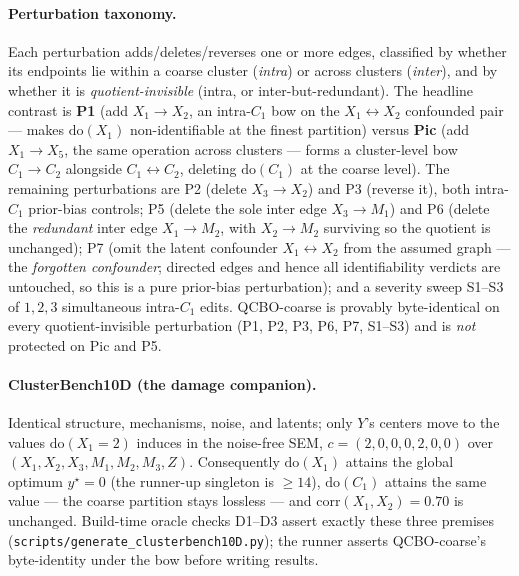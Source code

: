\documentclass[twoside]{article}
\newcommand{\doo}{\mathrm{do}}
\newcommand{\QCBO}{\textsc{QCBO}}
\newcommand{\CBO}{\textsc{CBO}}
\begin{document}
\paragraph{Perturbation taxonomy.}
Each perturbation adds/deletes/reverses one or more edges, classified by whether its
endpoints lie within a coarse cluster (\emph{intra}) or across clusters (\emph{inter}),
and by whether it is \emph{quotient-invisible} (intra, or inter-but-redundant). The
headline contrast is \textbf{P1} (add $X_1\!\to\!X_2$, an intra-$C_1$ bow on the
$X_1\!\leftrightarrow\!X_2$ confounded pair --- makes $\doo(X_1)$ non-identifiable at the
finest partition) versus \textbf{Pic} (add $X_1\!\to\!X_5$, the same operation across
clusters --- forms a cluster-level bow $C_1\!\to\!C_2$ alongside
$C_1\!\leftrightarrow\!C_2$, deleting $\doo(C_1)$ at the coarse level). The remaining
perturbations are P2 (delete $X_3\!\to\!X_2$) and P3 (reverse it), both intra-$C_1$
prior-bias controls; P5 (delete the sole inter edge $X_3\!\to\!M_1$) and P6 (delete the
\emph{redundant} inter edge $X_1\!\to\!M_2$, with $X_2\!\to\!M_2$ surviving so the
quotient is unchanged); P7 (omit the latent confounder $X_1\!\leftrightarrow\!X_2$
from the assumed graph --- the \emph{forgotten confounder}; directed edges and hence
all identifiability verdicts are untouched, so this is a pure prior-bias
perturbation); and a severity sweep S1--S3 of $1,2,3$ simultaneous intra-$C_1$
edits. \QCBO{}-coarse is provably byte-identical on every quotient-invisible
perturbation (P1, P2, P3, P6, P7, S1--S3) and is \emph{not} protected on Pic and P5.

\begin{table}[t]\centering
  \caption{The same intra bow, opposite sign: on \textsc{ClusterBench10D} the
  deleted arm \emph{is} the optimum's cheapest route, and full-DAG \CBO{}'s
  cumulative regret $R_T$ rises $4.6\times$ ($10$ seeds, $T{=}100$,
  $y^\star{=}0$).}
  \label{tab:damage}
  \small
\end{table}

\paragraph{ClusterBench10D (the damage companion).}
Identical structure, mechanisms, noise, and latents; only $Y$'s centers move to
the values $\doo(X_1{=}2)$ induces in the noise-free SEM, $c=(2,0,0,0,2,0,0)$
over $(X_1,X_2,X_3,M_1,M_2,M_3,Z)$. Consequently $\doo(X_1)$ attains the global
optimum $y^\star{=}0$ (the runner-up singleton is $\ge 14$), $\doo(C_1)$ attains
the same value --- the coarse partition stays lossless --- and
$\mathrm{corr}(X_1,X_2)=0.70$ is unchanged. Build-time oracle checks D1--D3
assert exactly these three premises
(\texttt{scripts/generate\_clusterbench10D.py}); the runner asserts
\QCBO{}-coarse's byte-identity under the bow before writing results.
\end{document}
